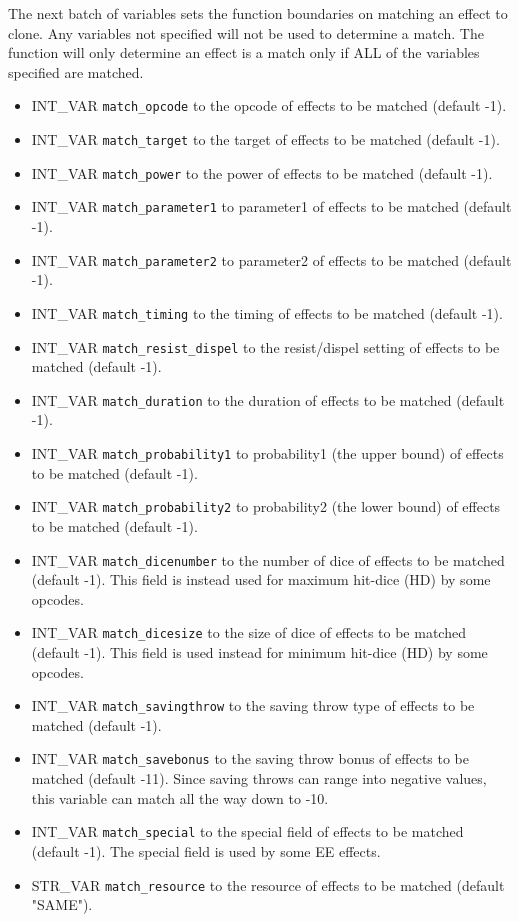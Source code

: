 \documentclass{article}
\begin{document}
The next batch of variables sets the function boundaries on matching an effect to clone. Any variables not specified will not be used to determine a match. The function will only determine an effect is a match only if ALL of the variables specified are matched.

\begin{itemize}
\item INT_VAR \verb+match_opcode+ to the opcode of effects to be matched (default -1).
\item INT_VAR \verb+match_target+ to the target of effects to be matched (default -1).
\item INT_VAR \verb+match_power+ to the power of effects to be matched (default -1).
\item INT_VAR \verb+match_parameter1+ to parameter1 of effects to be matched (default -1).
\item INT_VAR \verb+match_parameter2+ to parameter2 of effects to be matched (default -1).
\item INT_VAR \verb+match_timing+ to the timing of effects to be matched (default -1).
\item INT_VAR \verb+match_resist_dispel+ to the resist/dispel setting of effects to be matched (default -1).
\item INT_VAR \verb+match_duration+ to the duration of effects to be matched (default -1).
\item INT_VAR \verb+match_probability1+ to probability1 (the upper bound) of effects to be matched (default -1).
\item INT_VAR \verb+match_probability2+ to probability2 (the lower bound) of effects to be matched (default -1).
\item INT_VAR \verb+match_dicenumber+ to the number of dice of effects to be matched (default -1). This field is instead used for maximum hit-dice (HD) by some opcodes.
\item INT_VAR \verb+match_dicesize+ to the size of dice of effects to be matched (default -1). This field is used instead for minimum hit-dice (HD) by some opcodes.
\item INT_VAR \verb+match_savingthrow+ to the saving throw type of effects to be matched (default -1).
\item INT_VAR \verb+match_savebonus+ to the saving throw bonus of effects to be matched (default -11). Since saving throws can range into negative values, this variable can match all the way down to -10.
\item INT_VAR \verb+match_special+  to the special field of effects to be matched (default -1). The special field is used by some EE effects.
\item STR_VAR \verb+match_resource+ to the resource of effects to be matched (default "SAME").
\end{itemize}
\end{document}
